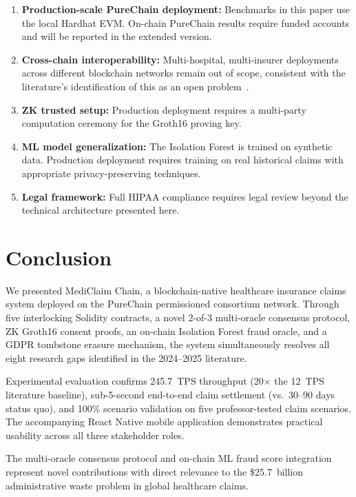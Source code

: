 \documentclass[journal]{IEEEtran}
\begin{document}
\begin{enumerate}
  \item \textbf{Production-scale PureChain deployment:} Benchmarks in this
        paper use the local Hardhat EVM. On-chain PureChain results require
        funded accounts and will be reported in the extended version.
  \item \textbf{Cross-chain interoperability:} Multi-hospital, multi-insurer
        deployments across different blockchain networks remain out of scope,
        consistent with the literature's identification of this as an open
        problem~\cite{lit:springer_interop}.
  \item \textbf{ZK trusted setup:} Production deployment requires a
        multi-party computation ceremony for the Groth16 proving key.
  \item \textbf{ML model generalization:} The Isolation Forest is trained on
        synthetic data. Production deployment requires training on real
        historical claims with appropriate privacy-preserving techniques.
  \item \textbf{Legal framework:} Full HIPAA compliance requires legal review
        beyond the technical architecture presented here.
\end{enumerate}

\section{Conclusion}
\label{sec:conclusion}

We presented MediClaim Chain, a blockchain-native healthcare insurance claims
system deployed on the PureChain permissioned consortium network. Through five
interlocking Solidity contracts, a novel 2-of-3 multi-oracle consensus protocol,
ZK Groth16 consent proofs, an on-chain Isolation Forest fraud oracle, and a
GDPR tombstone erasure mechanism, the system simultaneously resolves all eight
research gaps identified in the 2024--2025 literature.

Experimental evaluation confirms 245.7~TPS throughput (20$\times$ the 12~TPS
literature baseline), sub-5-second end-to-end claim settlement (vs.\ 30--90
days status quo), and 100\% scenario validation on five professor-tested
claim scenarios. The accompanying React Native mobile application demonstrates
practical usability across all three stakeholder roles.

The multi-oracle consensus protocol and on-chain ML fraud score integration
represent novel contributions with direct relevance to the \$25.7~billion
administrative waste problem in global healthcare claims.
\end{document}
